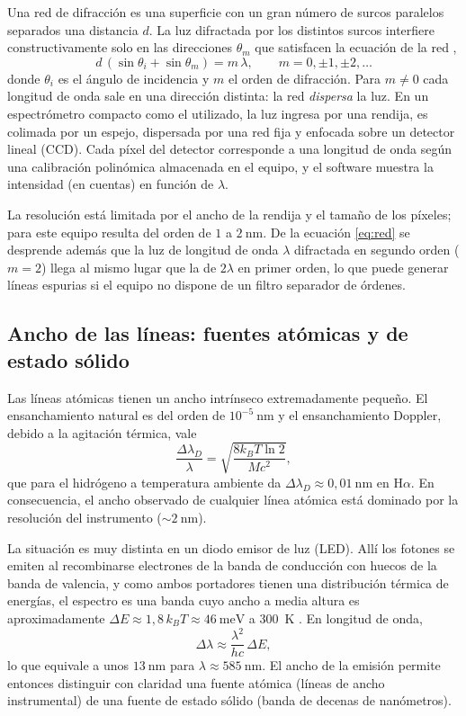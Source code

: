 \documentclass{article}
\newcommand{\nm}{\ \mathrm{nm}}
\begin{document}
Una red de difracción es una superficie con un gran número de surcos paralelos separados una distancia $d$. La luz difractada por los distintos surcos interfiere constructivamente solo en las direcciones $\theta_m$ que satisfacen la ecuación de la red \cite{hecht},
\begin{equation}
    d\,(\sin\theta_i+\sin\theta_m)=m\,\lambda,\qquad m=0,\pm1,\pm2,\dots
    \label{eq:red}
\end{equation}
donde $\theta_i$ es el ángulo de incidencia y $m$ el orden de difracción. Para $m\neq0$ cada longitud de onda sale en una dirección distinta: la red \emph{dispersa} la luz. En un espectrómetro compacto como el utilizado, la luz ingresa por una rendija, es colimada por un espejo, dispersada por una red fija y enfocada sobre un detector lineal (CCD). Cada píxel del detector corresponde a una longitud de onda según una calibración polinómica almacenada en el equipo, y el software muestra la intensidad (en cuentas) en función de $\lambda$.

La resolución está limitada por el ancho de la rendija y el tamaño de los píxeles; para este equipo resulta del orden de $1$ a $2\nm$. De la ecuación \eqref{eq:red} se desprende además que la luz de longitud de onda $\lambda$ difractada en segundo orden ($m=2$) llega al mismo lugar que la de $2\lambda$ en primer orden, lo que puede generar líneas espurias si el equipo no dispone de un filtro separador de órdenes.

\subsection{Ancho de las líneas: fuentes atómicas y de estado sólido}

Las líneas atómicas tienen un ancho intrínseco extremadamente pequeño. El ensanchamiento natural es del orden de $10^{-5}\nm$ y el ensanchamiento Doppler, debido a la agitación térmica, vale
\begin{equation}
    \frac{\Delta\lambda_D}{\lambda}=\sqrt{\frac{8k_BT\ln2}{Mc^2}},
\end{equation}
que para el hidrógeno a temperatura ambiente da $\Delta\lambda_D\approx0,01\nm$ en H$\alpha$. En consecuencia, el ancho observado de cualquier línea atómica está dominado por la resolución del instrumento ($\sim2\nm$).

La situación es muy distinta en un diodo emisor de luz (LED). Allí los fotones se emiten al recombinarse electrones de la banda de conducción con huecos de la banda de valencia, y como ambos portadores tienen una distribución térmica de energías, el espectro es una banda cuyo ancho a media altura es aproximadamente $\Delta E\approx1,8\,k_BT\approx46\ \mathrm{meV}$ a $300$~K \cite{schubert}. En longitud de onda,
\begin{equation}
    \Delta\lambda\approx\frac{\lambda^2}{hc}\,\Delta E,
    \label{eq:anchoLED}
\end{equation}
lo que equivale a unos $13\nm$ para $\lambda\approx585\nm$. El ancho de la emisión permite entonces distinguir con claridad una fuente atómica (líneas de ancho instrumental) de una fuente de estado sólido (banda de decenas de nanómetros).
\end{document}
